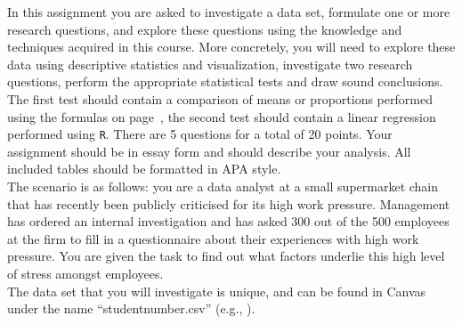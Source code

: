 {\footnotesize

In this assignment you are asked to investigate a data set, formulate one or more research questions, and explore these questions using the knowledge and techniques acquired in this course. More concretely, you will need to explore these data using descriptive statistics and visualization, investigate two research questions, perform the appropriate statistical tests and draw sound conclusions. The first test should contain a comparison of means or proportions performed using the formulas on page~\pageref{formulasheet}, the second test should contain a linear regression performed using \texttt{R}. There are 5 questions for a total of 20 points. Your assignment should be in essay form and should describe your analysis. All included tables should be formatted in APA style. \\

The scenario is as follows: you are a data analyst at a small supermarket chain that has recently been publicly criticised for its high work pressure. Management has ordered an internal investigation and has asked 300 out of the 500 employees at the firm to fill in a questionnaire about their experiences with high work pressure. You are given the task to find out what factors underlie this high level of stress amongst employees. \\

The data set that you will investigate is unique, and can be found in Canvas under the name “studentnumber.csv” (e.g., ). \\

}
